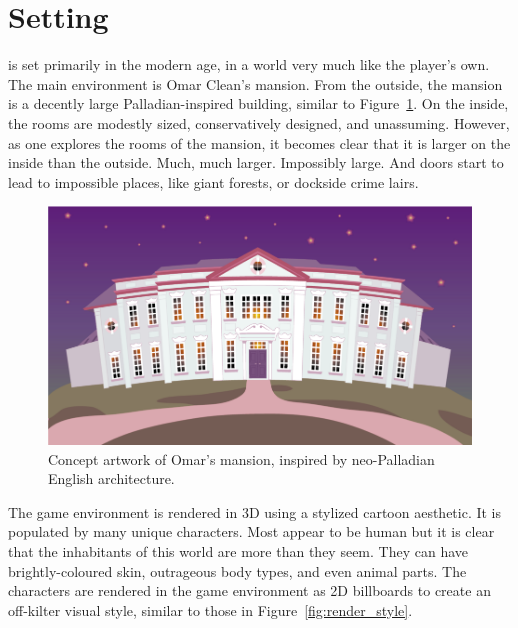 \section{Setting}
\ourgame{} is set primarily in the modern age, in a world very much like the player's own. The main environment is Omar Clean's mansion. From the outside, the mansion is a decently large Palladian-inspired building, similar to Figure~\ref{fig:mansion_photo}. On the inside, the rooms are modestly sized, conservatively designed, and unassuming. However, as one explores the rooms of the mansion, it becomes clear that it is larger on the inside than the outside. Much, much larger. Impossibly large. And doors start to lead to impossible places, like giant forests, or dockside crime lairs.

\begin{figure}[htb]
\centering\includegraphics[width=.4\linewidth]{images/mansion2}
\caption{Concept artwork of Omar's mansion, inspired by neo-Palladian English architecture.}
\label{fig:mansion_photo}
\end{figure}

The game environment is rendered in 3D using a stylized cartoon aesthetic. It is populated by many unique characters. Most appear to be human but it is clear that the inhabitants of this world are more than they seem. They can have brightly-coloured skin, outrageous body types, and even animal parts. The characters are rendered in the game environment as 2D billboards to create an off-kilter visual style, similar to those in Figure~\ref{fig:render_style}.

